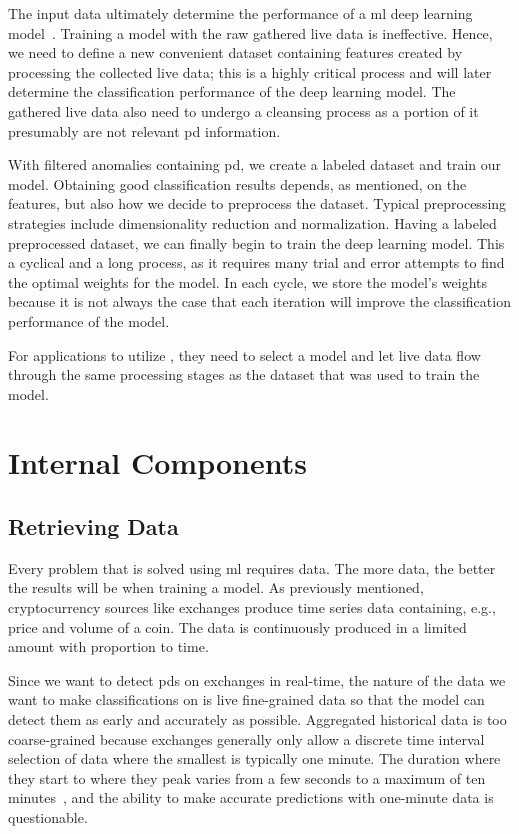 The input data ultimately determine the performance of a \ac{ml} deep learning model~\cite{mike_voets}. Training a model with the raw gathered live data is ineffective. Hence, we need to define a new convenient dataset containing features created by processing the collected live data; this is a highly critical process and will later determine the classification performance of the deep learning model. The gathered live data also need to undergo a cleansing process as a portion of it presumably are not relevant \ac{pd} information.

With filtered anomalies containing \ac{pd}, we create a labeled dataset and train our model. Obtaining good classification results depends, as mentioned, on the features, but also how we decide to preprocess the dataset. Typical preprocessing strategies include dimensionality reduction and normalization. Having a labeled preprocessed dataset, we can finally begin to train the deep learning model. This a cyclical and a long process, as it requires many trial and error attempts to find the optimal weights for the model. In each cycle, we store the model's weights because it is not always the case that each iteration will improve the classification performance of the model.

For applications to utilize \project, they need to select a model and let live data flow through the same processing stages as the dataset that was used to train the model.

\section{Internal Components}

\subsection{Retrieving Data}
Every problem that is solved using \ac{ml} requires data. The more data, the better the results will be when training a model. As previously mentioned, cryptocurrency sources like exchanges produce time series data containing, e.g., price and volume of a coin. The data is continuously produced in a limited amount with proportion to time.

Since we want to detect \acp{pd} on exchanges in real-time, the nature of the data we want to make classifications on is live fine-grained data so that the model can detect them as early and accurately as possible. Aggregated historical data is too coarse-grained because exchanges generally only allow a discrete time interval selection of data where the smallest is typically one minute. The duration where they start to where they peak varies from a few seconds to a maximum of ten minutes~\cite{P&D_MIT_crypto, P&D_to_the_moon}, and the ability to make accurate predictions with one-minute data is questionable.


